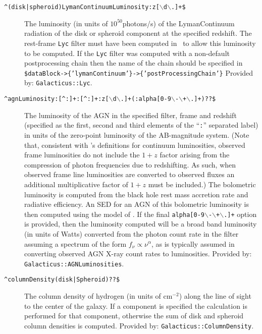 \begin{description}
 \item[{\tt \textasciicircum(disk|spheroid)LymanContinuumLuminosity:z[$\backslash$d$\backslash$.]+\$}] The luminosity (in units of $10^{50}$photons/s) of the \gls{LymanContinuum} radiation of the disk or spheroid component at the specified redshift. The rest-frame {\tt Lyc} filter must have been computed in \glc\ to allow this luminosity to be computed. If the {\tt Lyc} filter was computed with a non-default postprocessing chain then the name of the chain should be specified in {\tt \$dataBlock-\textgreater\{'lymanContinuum'\}-\textgreater\{'postProcessingChain'\}} Provided by: {\tt Galacticus::Lyc}.
 \item[{\tt \textasciicircum agnLuminosity:[\textasciicircum:]+:[\textasciicircum:]+:z[$\backslash$d$\backslash$.]+(:alpha[0-9$\backslash$-$\backslash$+$\backslash$.]+)??\$}] The luminosity of the AGN in the specified filter, frame and redshift (specified as the first, second and third elements of the ``{\tt :}'' separated label) in units of the zero-point luminosity of the AB-magnitude system. (Note that, consistent with \glc's definitions for continuum luminosities, observed frame luminosities do not include the $1+z$ factor arising from the compression of photon frequencies due to redshifting. As such, when observed frame line luminosities are converted to observed fluxes an additional multiplicative factor of $1+z$ must be included.) The bolometric luminosity is computed from the black hole rest mass accretion rate and radiative efficiency. An SED for an AGN of this bolometric luminosity is then computed using the model of \cite{hopkins_observational_2007}. If the final {\tt alpha[0-9$\backslash$-$\backslash$+$\backslash$.]+} option is provided, then the luminosity computed will be a broad band luminosity (in units of Watts) converted from the photon count rate in the filter assuming a spectrum of the form $f_\nu \propto \nu^\alpha$, as is typically assumed in converting observed AGN X-ray count rates to luminosities. Provided by: {\tt Galacticus::AGNLuminosities}.


 \item[{\tt \textasciicircum columnDensity(disk|Spheroid)??\$}] The column density of hydrogen (in units of cm$^{-2}$) along the line of sight to the center of the galaxy. If a component is specified the calculation is performed for that component, otherwise the sum of disk and spheroid column densities is computed. Provided by: {\tt Galacticus::ColumnDensity}.




\end{description}
